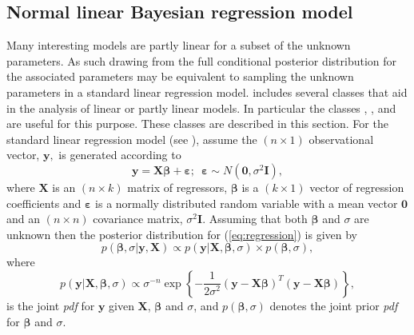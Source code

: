 \documentclass[article]{jss}
\begin{document}
\subsection{Normal linear Bayesian regression model}
\label{sec: Regression Model}

Many interesting models are partly linear for a subset of the unknown
parameters. As such drawing from the full conditional posterior
distribution for the associated parameters may be equivalent to
sampling the unknown parameters in a standard linear regression model.
 includes several classes that aid in the analysis of
linear or partly linear models. In particular the classes
, ,
 and  are useful for
this purpose. These classes are described in this section.  For the
standard linear regression model (see \cite{Zellner1971}), assume the
$\left(n\times1\right)$ observational vector, $\bm{y},$ is generated
according to\begin{equation}
  \bm{y}=\bm{X}\bm{\beta}+\bm{\varepsilon};\,\,\,\bm{\varepsilon}\sim
  N(\bm{0},\sigma^{2}\bm{I}),\label{eq:regression}
\end{equation} where
$\bm{X}$ is an $(n\times k)$ matrix of regressors, $\bm{\beta}$ is a
$\left(k\times1\right)$ vector of regression coefficients and
$\bm{\varepsilon}$ is a normally distributed random variable with a
mean vector $\bm{0}$ and an $\left(n\times n\right)$ covariance
matrix, $\sigma^{2}\bm{I}.$ Assuming that both $\bm{\beta}$ and
$\sigma$ are unknown then the posterior distribution for
(\ref{eq:regression}) is given by\begin{equation}
  p(\bm{\beta},\sigma|\bm{y},\bm{X})\propto
  p(\bm{y}|\bm{X},\bm{\beta},\sigma)\times
  p(\bm{\beta},\sigma),\label{eq:post regression}
\end{equation} where
\begin{equation}
  p(\bm{y}|\bm{X},\bm{\beta},\sigma)\propto\sigma^{-n}\exp\left\{
    -\frac{1}{2\sigma^{2}}\left(\bm{y}-\bm{X}\bm{\beta}\right)^{T}\left(\bm{y}-\bm{X}\bm{\beta}\right)\right\}
  ,\label{eq:likelihood regression}
\end{equation} is the joint
\emph{pdf} for $\bm{y}$ given $\bm{X}$, $\bm{\beta}$ and
$\sigma$, and\emph{ $p(\bm{\beta},\sigma)$ } denotes the joint
prior \emph{pdf} for $\bm{\beta}$ and $\sigma$.
\end{document}
